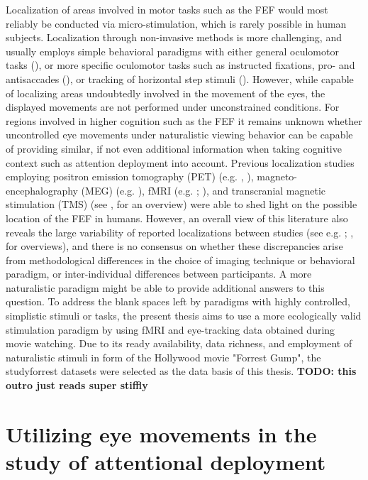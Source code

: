 \documentclass[a4paper, 12pt]{scrreprt}
\begin{document}
Localization of areas involved in motor tasks such as the FEF would most reliably be conducted via micro-stimulation, which is rarely possible in human subjects. Localization through non-invasive methods is more challenging, and usually employs simple behavioral paradigms with either general oculomotor tasks (\cite{paus1996location}), or more specific oculomotor tasks such as instructed fixations, pro- and antisaccades (\cite{connolly2002human}), or tracking of horizontal step stimuli (\cite{alkan2011differentiation}). However, while capable of localizing areas undoubtedly involved in the movement of the eyes, the displayed movements are not performed under unconstrained conditions. For regions involved in higher cognition such as the FEF it remains unknown whether uncontrolled eye movements under naturalistic viewing behavior can be capable of providing similar, if not even additional information when taking cognitive context such as attention deployment into account. Previous localization studies employing positron emission tomography (PET) (e.g. \textcite{paus1996location}, \cite{kawashima1998oculomotor}), magneto-encephalography (MEG) (e.g. \cite{ioannides2004meg}), fMRI (e.g. \cite{petit1999functional}; \cite{connolly2002human}), and transcranial magnetic stimulation (TMS) (see \textcite{vernet2014corrigendum}, for an overview) were able to shed light on the possible location of the FEF in humans. However, an overall view of this literature also reveals the large variability of reported localizations between studies (see e.g. \textcite{paus1996location}; \textcite{vernet2014corrigendum}, for overviews), and there is no consensus on whether these discrepancies arise from methodological differences in the choice of imaging technique or behavioral paradigm, or inter-individual differences between participants. A more naturalistic paradigm might be able to provide additional answers to this question. \newline
To address the blank spaces left by paradigms with highly controlled, simplistic stimuli or tasks, the present thesis aims to use a more ecologically valid stimulation paradigm by using fMRI and eye-tracking data obtained during movie watching. Due to its ready availability, data richness, and employment of naturalistic stimuli in form of the Hollywood movie "Forrest Gump", the studyforrest datasets were selected as the data basis of this thesis. \textbf{TODO: this outro just reads super stiffly}

\section{Utilizing eye movements in the study of attentional deployment}\label{section:eyeutils}
\end{document}
